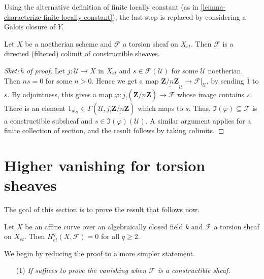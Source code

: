 \begin{remark}
\label{remark-alternative}
Using the alternative definition of finite locally constant (as in
\ref{lemma-characterize-finite-locally-constant}), the last step is replaced
by considering a Galois closure of $Y$.
\end{remark}

\begin{lemma}
\label{lemma-torsion-colimit-constructible}
Let $X$ be a noetherian scheme and $\mathcal{F}$ a torsion sheaf on $X_{et}$.
Then $\mathcal{F}$ is a directed (filtered) colimit of constructible sheaves.
\end{lemma}

\begin{proof}[Sketch of proof]
Let $j: \mathcal{U} \to X$ in $X_{et}$ and $s\in \mathcal{F}(\mathcal{U})$ for
some $\mathcal{U}$ noetherian. Then $ns = 0$ for some $n>0$. Hence we get a map
$\underline{\mathbf{Z}/n\mathbf{Z}}_\mathcal{U}\to \mathcal{F}|_\mathcal{U}$,
by sending $\bar 1$ to $s$. By adjointness, this gives a map $\varphi:
j_!(\underline{\mathbf{Z}/n\mathbf{Z}}) \to \mathcal{F}$ whose image contains
$s$. There is an element $1_{\text{id}_\mathcal{U}} \in \Gamma(\mathcal{U},
j_!\underline{\mathbf{Z}/n\mathbf{Z}})$ which maps to $s$. Thus, $\Im(\varphi)
\subseteq \mathcal{F}$ is a constructible subsheaf and $s\in
\Im(\varphi)(\mathcal{U})$. A similar argument applies for a finite collection
of section, and the result follows by taking colimits.
\end{proof}




\section{Higher vanishing for torsion sheaves}
\label{section-vanishing-torsion}

\noindent
The goal of this section is to prove the result that follows now.

\begin{theorem}
\label{theorem-vanishing-affine-curves}
Let $X$ be an affine curve over an algebraically closed field $k$ and
$\mathcal{F}$ a torsion sheaf on $X_{et}$. Then $H_{et}^q(X, \mathcal{F}) = 0$
for all $q\geq 2$.
\end{theorem}

\noindent
We begin by reducing the proof to a more simpler statement.
\begin{enumerate}
\item[(1)] {\it If suffices to prove the vanishing when $\mathcal{F}$
is a constructible sheaf.}
\end{enumerate}

